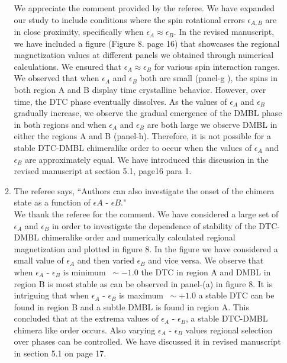 \documentclass[aps,prb,reprint,showpacs,floatfix,superscriptaddress, onecolumn, nofootinbib, 10pt]{revtex4-2}
\newcommand{\response}[1]{{\color{black}#1}} %
\newcommand{\comment}[1]{{\color{blue}#1}} %
\begin{document}
\begin{enumerate}
\begin{enumerate}
		\response{	
		We appreciate the comment provided by the referee. We have expanded our study to include conditions where the spin rotational errors $\epsilon_{A,B}$ are in close proximity, specifically when $\epsilon_A \approx \epsilon_B$. In the revised manuscript, we have included a figure (Figure 8. page 16) that showcases the regional magnetization values at different panels we obtained through numerical calculations. We ensured that $\epsilon_A \approx \epsilon_B$ for various spin interaction ranges. We observed that when $\epsilon_A$ and $\epsilon_B$ both are small (panel-g ), the spins in both region A and B display time crystalline behavior. However, over time, the DTC phase eventually dissolves. As the values of $\epsilon_A$ and $\epsilon_B$ gradually increase, we observe the gradual emergence of the DMBL phase in both regions and when $\epsilon_A$ and $\epsilon_B$ are both large we observe DMBL in either  the regions A and B (panel-h). Therefore, it is not possible for a stable DTC-DMBL chimeralike order to occur when the values of $\epsilon_A$ and $\epsilon_B$ are approximately equal. We have introduced this discussion in the revised manuscript at section 5.1, page16 para 1.
		}\\
	
		\item The referee says, \comment{``Authors can also investigate the onset of the chimera state as a function of $\epsilon A$ - $\epsilon B$."}\\
		
		\response{We thank the referee for the comment. We have considered a large set of $\epsilon_A$ and $\epsilon_B$ in order to investigate the dependence of stability of the DTC-DMBL chimeralike order and numerically calculated regional magnetization and plotted in figure 8. In the figure we have considered a small value of $\epsilon_A$ and then varied $\epsilon_B$ and vice versa. We observe that when $\epsilon_A$ - $\epsilon_B$ is minimum $~\sim -1.0$ the DTC in region A and DMBL in region B is most stable as can be observed in panel-(a) in figure 8. It is intriguing that when   $\epsilon_A$ - $\epsilon_B$ is maximum $~\sim +1.0$ a stable DTC can be found in region B and a subtle DMBL is found in region A. This concluded that at the extrema values of  $\epsilon_A$ - $\epsilon_B$, a stable DTC-DMBL chimera like order occurs. Also varying $\epsilon_A$ - $\epsilon_B$ values regional selection over phases can be controlled. We have discussed it in revised manuscript in section 5.1 on page 17. }
		

\end{enumerate}
\end{enumerate}
\end{document}
